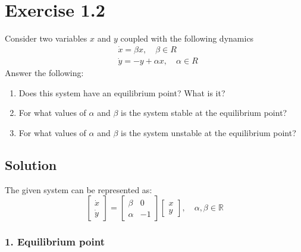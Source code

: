 \section*{Exercise 1.2}

Consider two variables \( x \) and \( y \) coupled with the following dynamics
\begin{align*}
     & \dot{x}=\beta x, \quad \beta \in R      \\
     & \dot{y}=-y+\alpha x, \quad \alpha \in R
\end{align*}
Answer the following:
\begin{enumerate}[noitemsep]
    \item Does this system have an equilibrium point? What is it?
    \item For what values of \( \alpha \) and \( \beta \) is the system stable at the equilibrium point?
    \item For what values of \( \alpha \) and \( \beta \) is the system unstable at the equilibrium point?
\end{enumerate}

\vspace*{-1em}
\subsection*{Solution}

The given system can be represented as:
\begin{equation*}
    \begin{bmatrix}
        \dot{x} \\
        \dot{y}
    \end{bmatrix}
    =
    \begin{bmatrix}
        \beta  & 0  \\
        \alpha & -1
    \end{bmatrix}
    \begin{bmatrix}
        x \\
        y
    \end{bmatrix}
    ,\quad \alpha, \beta \in \mathbb{R}
\end{equation*}

\vspace*{-1em}
\subsubsection*{1. Equilibrium point}

